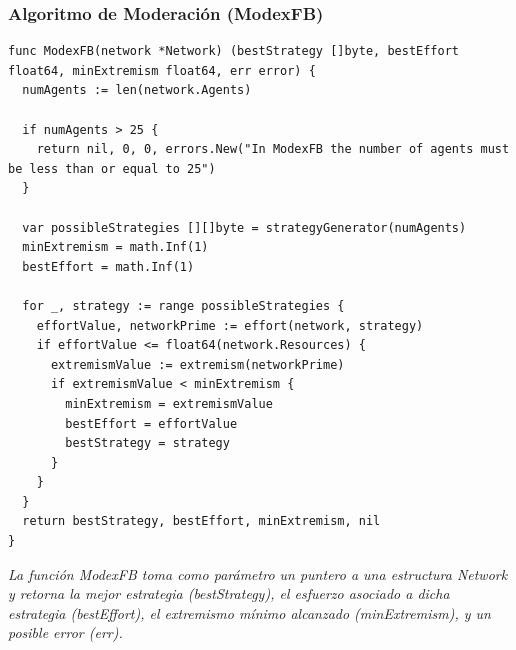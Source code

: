 \documentclass[letterpaper,10pt]{article}
\begin{document}
\subsubsection*{Algoritmo de Moderación (ModexFB)}
\begin{lstlisting}[caption={Algoritmo de Fuerza Bruta}, label={lst:modexfb}]
func ModexFB(network *Network) (bestStrategy []byte, bestEffort float64, minExtremism float64, err error) {
  numAgents := len(network.Agents)
  
  if numAgents > 25 {
    return nil, 0, 0, errors.New("In ModexFB the number of agents must be less than or equal to 25")
  }

  var possibleStrategies [][]byte = strategyGenerator(numAgents)
  minExtremism = math.Inf(1)
  bestEffort = math.Inf(1)
  
  for _, strategy := range possibleStrategies {
    effortValue, networkPrime := effort(network, strategy)
    if effortValue <= float64(network.Resources) {
      extremismValue := extremism(networkPrime)
      if extremismValue < minExtremism {
        minExtremism = extremismValue
        bestEffort = effortValue
        bestStrategy = strategy
      }
    }
  }
  return bestStrategy, bestEffort, minExtremism, nil
}
\end{lstlisting}
\textit{La función \textit{ModexFB} toma como parámetro un puntero a una estructura \textit{Network} y retorna la mejor estrategia (\textit{bestStrategy}), el esfuerzo asociado a dicha estrategia (\textit{bestEffort}), el extremismo mínimo alcanzado (\textit{minExtremism}), y un posible error (\textit{err}).}
\end{document}
